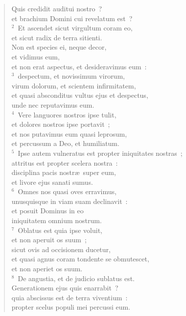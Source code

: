 \begin{flushleft}\begin{verse}\vspace{-19pt}\hspace{6pt}Quis credidit auditui nostro~?\\\hspace{6pt} et brachium Domini cui revelatum est~?\\
${}^{2}$~Et ascendet sicut virgultum coram eo,\\ et sicut radix de terra sitienti.\\ Non est species ei, neque decor,\\ et vidimus eum,\\ et non erat aspectus, et desideravimus eum~:\\
${}^{3}$~despectum, et novissimum virorum,\\ virum dolorum, et scientem infirmitatem,\\ et quasi absconditus vultus ejus et despectus,\\ unde nec reputavimus eum.\\
${}^{4}$~Vere languores nostros ipse tulit,\\ et dolores nostros ipse portavit~;\\ et nos putavimus eum quasi leprosum,\\ et percussum a Deo, et humiliatum.\\
${}^{5}$~Ipse autem vulneratus est propter iniquitates nostras~;\\ attritus est propter scelera nostra~:\\ disciplina pacis nostr\ae\ super eum,\\ et livore ejus sanati sumus.\\
${}^{6}$~Omnes nos quasi oves erravimus,\\ unusquisque in viam suam declinavit~:\\ et posuit Dominus in eo\\ iniquitatem omnium nostrum.\\
${}^{7}$~Oblatus est quia ipse voluit,\\ et non aperuit os suum~;\\ sicut ovis ad occisionem ducetur,\\ et quasi agnus coram tondente se obmutescet,\\ et non aperiet os suum.\\
${}^{8}$~De angustia, et de judicio sublatus est.\\ Generationem ejus quis enarrabit~?\\ quia abscissus est de terra viventium~:\\ propter scelus populi mei percussi eum.\\

\end{verse}
\end{flushleft}
